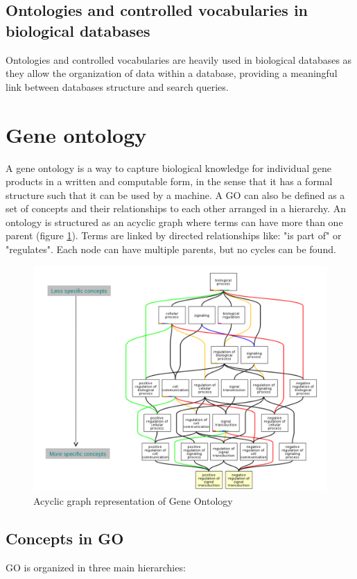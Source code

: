	\subsection{Ontologies and controlled vocabularies in biological databases}
	Ontologies and controlled vocabularies are heavily used in biological databases as they allow the organization of data within a database, providing a meaningful link between databases structure and search queries.

\section{Gene ontology}
A gene ontology is a way to capture biological knowledge for individual gene products in a written and computable form, in the sense that it has a formal structure such that it can be used by a machine.
A GO can also be defined as a set of concepts and their relationships to each other arranged in a hierarchy.
An ontology is structured as an acyclic graph where terms can have more than one parent (figure \ref{fig:GO}).
Terms are linked by directed relationships like: "is part of" or "regulates".
Each node can have multiple parents, but no cycles can be found.

\begin{figure}[H]
	\centering
	\includegraphics[scale=0.35]{GO}
	\caption{Acyclic graph representation of Gene Ontology}
	\label{fig:GO}
\end{figure}

	\subsection{Concepts in GO}
	GO is organized in three main hierarchies:

